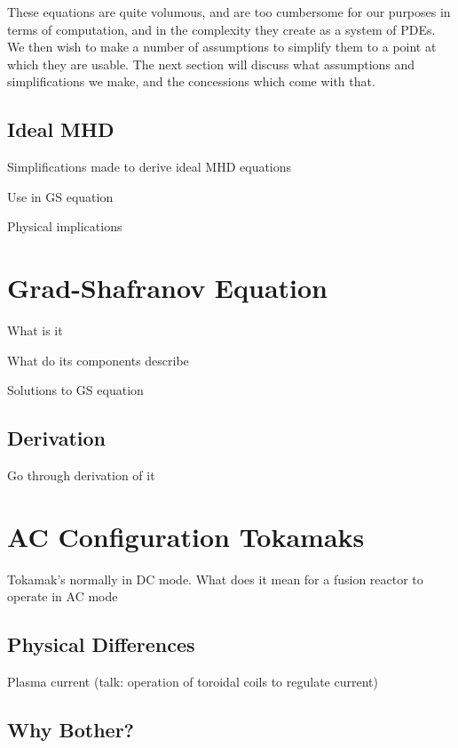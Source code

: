 These equations are quite volumous, and are too 
cumbersome for our purposes in terms of computation, and in the complexity they create as a system of PDEs.
We then wish to make a number of assumptions to simplify them to a point at which they are usable. The next 
section will discuss what assumptions and simplifications we make, and the concessions which come with that.

\subsection{Ideal MHD}

Simplifications made to derive ideal MHD equations 

Use in GS equation 

Physical implications

\section{Grad-Shafranov Equation}

What is it

What do its components describe

Solutions to GS equation 

\subsection{Derivation}

Go through derivation of it 

\section{AC Configuration Tokamaks}

Tokamak's normally in DC mode. What does it mean for a fusion reactor 
to operate in AC mode

\subsection{Physical Differences}

Plasma current (talk: operation of toroidal coils to regulate current)



\subsection{Why Bother?}

